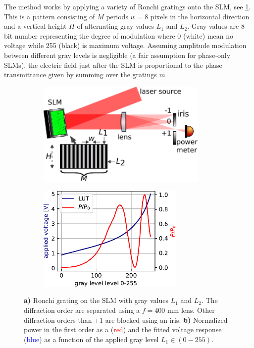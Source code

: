 The method works by applying a variety of Ronchi gratings onto the SLM, see \cref{fig:LUTCalibrationSetup}.
This is a pattern consisting of $M$ periods $w=8$ pixels in the horizontal direction and a vertical height $H$ of alternating gray values $L_1$ and $L_2$.
Gray values are 8 bit number representing the degree of modulation where 0 (white) mean no voltage while 255 (black) is maximum voltage. 
Assuming amplitude modulation between different gray levels is negligible (a fair assumption for phase-only SLMs), the electric field just after the SLM is proportional to the phase transmittance given by summing over the gratings $m$ \cite{Zhang1994}

\begin{figure}
	\begin{subfigure}{.49\linewidth}
		\flushleft
		\includegraphics[height=5.1cm]{figures/LUTcalibrationSetup.pdf}
		\caption{}
		\label{fig:LUTCalibrationSetup}
	\end{subfigure}
	\hfill
	\begin{subfigure}{.49\linewidth}
		\flushright
		\includegraphics[height=5.1cm]{figures/LUTplot.pdf}
		\caption{}
		\label{fig:LUTcalibration}
	\end{subfigure}
	\caption{\textsf{\textbf{a)}} Ronchi grating on the SLM with gray values $L_1$ and $L_2$. 
	The diffraction order are separated using a $f=400$ mm lens. 
	Other diffraction orders than $+1$ are blocked using an iris. 
	\textsf{\textbf{b)}} Normalized power in the first order as a (\textcolor{red}{red}) and the fitted voltage response (\textcolor{blue}{blue}) as a function of the applied gray level $L_1 \in (0-255)$.}
\end{figure}

